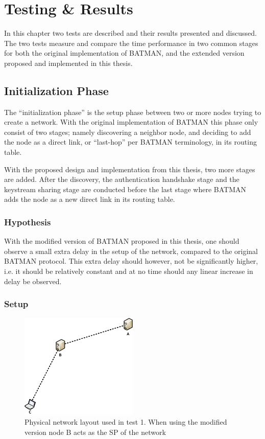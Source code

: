 \chapter{Testing \& Results}
\label{ch:testing_results}
\acresetall

In this chapter two tests are described and their results presented and
discussed. The two tests measure and compare the time performance in two common
stages for both the original implementation of BATMAN, and the extended version
proposed and implemented in this thesis.

\section{Initialization Phase}
The ``initialization phase'' is the setup phase between two or more nodes trying
to create a network. With the original implementation of BATMAN this phase only
consist of two stages; namely discovering a neighbor node, and deciding to add
the node as a direct link, or ``last-hop'' per BATMAN terminology, in its
routing table.

With the proposed design and implementation from this thesis, two more stages
are added. After the discovery, the authentication handshake stage and the
keystream sharing stage are conducted before the last stage where BATMAN adds
the node as a new direct link in its routing table.

\subsection{Hypothesis}
With the modified version of BATMAN proposed in this thesis, one should observe
a small extra delay in the setup of the network, compared to the original
BATMAN protocol. This extra delay should however, not be significantly higher,
i.e. it should be relatively constant and at no time should any linear increase
in delay be observed.

\subsection{Setup}

\begin{figure}[h]
	\centering
	\includegraphics[width=0.5\textwidth]{images/setup_test_1.png}
	\caption{Physical network layout used in test 1. When using the modified version node B acts as the SP of the network}
	\label{fig:setup_test_1}
\end{figure}

